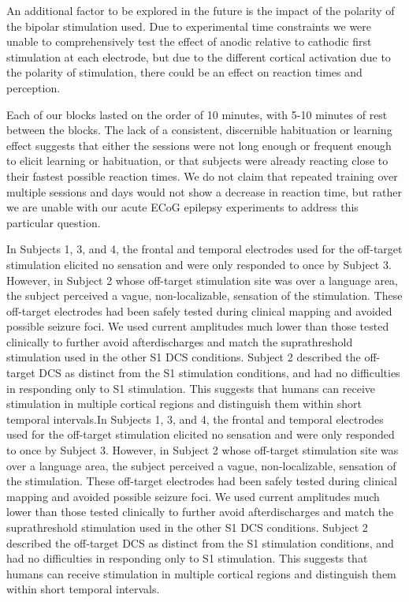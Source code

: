 An additional factor to be explored in the future is the impact of the polarity of the bipolar stimulation used. Due to experimental time constraints we were unable to comprehensively test the effect of anodic relative to cathodic first stimulation at each electrode, but due to the different cortical activation due to the polarity of stimulation, there could be an effect on reaction times and perception.\cite{Tehovnik2009,Yazdan-Shahmorad2011}

Each of our blocks lasted on the order of 10 minutes, with 5-10 minutes of rest between the blocks. The lack of a consistent, discernible habituation or learning effect suggests that either the sessions were not long enough or frequent enough to elicit learning or habituation, or that subjects were already reacting close to their fastest possible reaction times. We do not claim that repeated training over multiple sessions and days would not show a decrease in reaction time, but rather we are unable with our acute ECoG epilepsy experiments to address this particular question.


In Subjects 1, 3, and 4, the frontal and temporal electrodes used for the off-target stimulation elicited no sensation and were only responded to once by Subject 3. However, in Subject 2 whose off-target stimulation site was over a language area, the subject perceived a vague, non-localizable, sensation of the stimulation. These off-target electrodes had been safely tested during clinical mapping and avoided possible seizure foci. We used current amplitudes much lower than those tested clinically to further avoid afterdischarges and match the suprathreshold stimulation used in the other S1 DCS conditions. Subject 2 described the off-target DCS as distinct from the S1 stimulation conditions, and had no difficulties in responding only to S1 stimulation. This suggests that humans can receive stimulation in multiple cortical regions and distinguish them within short temporal intervals.In Subjects 1, 3, and 4, the frontal and temporal electrodes used for the off-target stimulation elicited no sensation and were only responded to once by Subject 3. However, in Subject 2 whose off-target stimulation site was over a language area, the subject perceived a vague, non-localizable, sensation of the stimulation. These off-target electrodes had been safely tested during clinical mapping and avoided possible seizure foci. We used current amplitudes much lower than those tested clinically to further avoid afterdischarges and match the suprathreshold stimulation used in the other S1 DCS conditions. Subject 2 described the off-target DCS as distinct from the S1 stimulation conditions, and had no difficulties in responding only to S1 stimulation. This suggests that humans can receive stimulation in multiple cortical regions and distinguish them within short temporal intervals.

